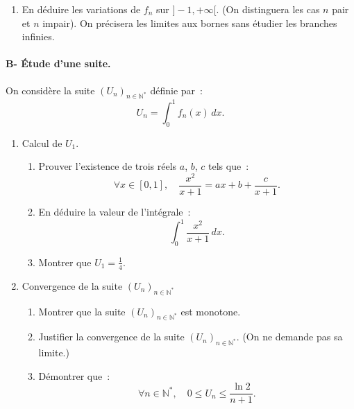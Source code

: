 \begin{exercice}
\begin{enumerate}
\begin{enumerate}
\item En d\'{e}duire les variations de $f_{n}$ sur $]-1,+\infty [$. (On
distinguera les cas $n$ pair et $n$ impair). On pr\'{e}cisera les limites
aux bornes sans \'{e}tudier les branches infinies.
\end{enumerate}
\end{enumerate}

\paragraph{B- \'Etude d'une suite.\\}

On consid\`ere la suite $\left(U_n\right)_{n\in\mathbb{N}^*}$ d\'efinie
par~: 
\begin{equation*}
U_n=\int_0^1f_n(x)\,dx.
\end{equation*}
\begin{enumerate}
\item Calcul de $U_1$.


\begin{enumerate}
\item Prouver l'existence de trois r\'{e}els $a$, $b$, $c$ tels que~: 
\begin{equation*}
\forall x\in [0,1],\quad \frac{x^{2}}{x+1}=ax+b+\frac{c}{x+1}.
\end{equation*}

\item En d\'{e}duire la valeur de l'int\'{e}grale~: 
\begin{equation*}
\int_{0}^{1}\frac{x^{2}}{x+1}\,dx.
\end{equation*}

\item Montrer que $\displaystyle U_{1}=\frac{1}{4}$.
\end{enumerate}

\item Convergence de la suite $\left(U_n\right)_{n\in\mathbb{N}^*}$\\

\begin{enumerate}
\item Montrer que la suite $\left( U_{n}\right) _{n\in \mathbb{N}^{*}}$ est
monotone.

\item Justifier la convergence de la suite $\left( U_{n}\right) _{n\in 
\mathbb{N}^{*}}$. (On ne demande pas sa limite.)

\item D\'{e}montrer que~: 
\begin{equation*}
\forall n\in \mathbb{N}^{*},\quad 0\leqslant U_{n}\leqslant \frac{\ln 2}{n+1}%
.
\end{equation*}


\end{enumerate}
\end{enumerate}
\end{exercice}
